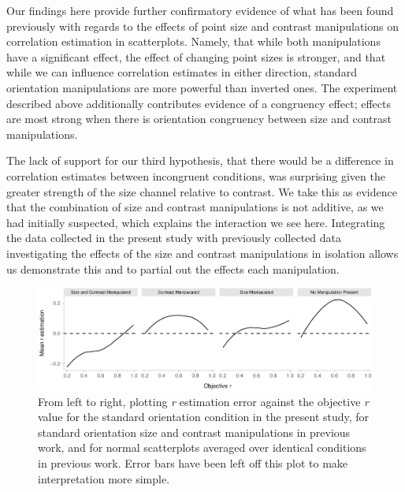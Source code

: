 \documentclass[manuscript, review, anonymous, screen]{acmart}
\begin{document}
Our findings here provide further confirmatory evidence of what has been
found previously with regards to the effects of point size and contrast
manipulations on correlation estimation in scatterplots. Namely, that
while both manipulations have a significant effect, the effect of
changing point sizes is stronger, and that while we can influence
correlation estimates in either direction, standard orientation
manipulations are more powerful than inverted ones. The experiment
described above additionally contributes evidence of a congruency
effect; effects are most strong when there is orientation congruency
between size and contrast manipulations.

The lack of support for our third hypothesis, that there would be a
difference in correlation estimates between incongruent conditions, was
surprising given the greater strength of the size channel relative to
contrast. We take this as evidence that the combination of size and
contrast manipulations is not additive, as we had initially suspected,
which explains the interaction we see here. Integrating the data
collected in the present study with previously collected data
investigating the effects of the size and contrast manipulations in
isolation allows us demonstrate this and to partial out the effects each
manipulation.

\begin{figure}

{\centering \includegraphics[width=1\textwidth,height=\textheight]{size_and_contrast_new_files/figure-pdf/fig-error-bars-all-exp-1.pdf}

}

\caption{\label{fig-error-bars-all-exp}From left to right, plotting
\emph{r} estimation error against the objective \emph{r} value for the
standard orientation condition in the present study, for standard
orientation size and contrast manipulations in previous work, and for
normal scatterplots averaged over identical conditions in previous work.
Error bars have been left off this plot to make interpretation more
simple.}

\end{figure}
\end{document}
